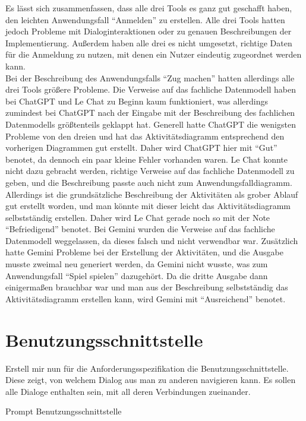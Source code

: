 Es lässt sich zusammenfassen, dass alle drei Tools es ganz gut geschafft haben, den leichten Anwendungsfall ``Anmelden'' zu erstellen. Alle drei Tools 
hatten jedoch Probleme mit Dialoginteraktionen oder zu genauen Beschreibungen der Implementierung. Außerdem haben alle drei es nicht umgesetzt, 
richtige Daten für die Anmeldung zu nutzen, mit denen ein Nutzer eindeutig zugeordnet werden kann.\\
Bei der Beschreibung des Anwendungsfalls ``Zug machen'' hatten allerdings alle drei Tools größere Probleme. Die Verweise auf das fachliche 
Datenmodell haben bei ChatGPT und Le Chat zu Beginn kaum funktioniert, was allerdings zumindest bei ChatGPT nach der Eingabe mit der Beschreibung 
des fachlichen Datenmodells größtenteils geklappt hat. Generell hatte ChatGPT die wenigsten Probleme von den dreien und hat das Aktivitätsdiagramm 
entsprechend den vorherigen Diagrammen gut erstellt. Daher wird ChatGPT hier mit ``Gut'' benotet, da dennoch ein paar kleine Fehler vorhanden 
waren. Le Chat konnte nicht dazu gebracht werden, richtige Verweise auf das fachliche Datenmodell zu geben, und die Beschreibung passte auch 
nicht zum Anwendungsfalldiagramm. Allerdings ist die grundsätzliche Beschreibung der Aktivitäten als grober Ablauf gut erstellt worden, und man 
könnte mit dieser leicht das Aktivitätsdiagramm selbstständig erstellen. Daher wird Le Chat gerade noch so mit der Note ``Befriedigend'' benotet. 
Bei Gemini wurden die Verweise auf das fachliche Datenmodell weggelassen, da dieses falsch und nicht verwendbar war. Zusätzlich hatte Gemini 
Probleme bei der Erstellung der Aktivitäten, und die Ausgabe musste zweimal neu generiert werden, da Gemini nicht wusste, was zum Anwendungsfall 
``Spiel spielen'' dazugehört. Da die dritte Ausgabe dann einigermaßen brauchbar war und man aus der Beschreibung selbstständig das Aktivitätsdiagramm erstellen 
kann, wird Gemini mit ``Ausreichend'' benotet.

\section*{Benutzungsschnittstelle}

\begin{prompt}[H]
    \begin{tcolorbox}[colback=gray!20, colframe=gray!20, boxrule=0pt, sharp corners] 
        Erstell mir nun für die Anforderungsspezifikation die Benutzungsschnittstelle. Diese zeigt, von welchem Dialog aus man zu anderen 
        navigieren kann. Es sollen alle Dialoge enthalten sein, mit all deren Verbindungen zueinander.
        \vfill
    \end{tcolorbox}
    \caption{Prompt Benutzungsschnittstelle}
    \label{Prompt Benutzungsschnittstelle}
\end{prompt}


